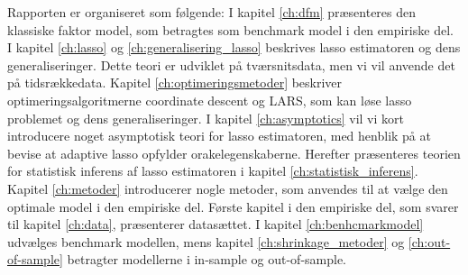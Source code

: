 Rapporten er organiseret som følgende: 
I kapitel \ref{ch:dfm} præsenteres den klassiske faktor model, som betragtes som benchmark model i den empiriske del.
I kapitel \ref{ch:lasso} og \ref{ch:generalisering_lasso} beskrives lasso estimatoren og dens generaliseringer. Dette teori er udviklet på tværsnitsdata, men vi vil anvende det på tidsrækkedata.
Kapitel \ref{ch:optimeringsmetoder} beskriver optimeringsalgoritmerne coordinate descent og LARS, som kan løse lasso problemet og dens generaliseringer.
I kapitel \ref{ch:asymptotics} vil vi kort introducere noget asymptotisk teori for lasso estimatoren, med henblik på at bevise at adaptive lasso opfylder orakelegenskaberne.
Herefter præsenteres teorien for statistisk inferens af lasso estimatoren i kapitel \ref{ch:statistisk_inferens}.
Kapitel \ref{ch:metoder} introducerer nogle metoder, som anvendes til at vælge den optimale model i den empiriske del.
Første kapitel i den empiriske del, som svarer til kapitel \ref{ch:data}, præsenterer datasættet.
I kapitel \ref{ch:benhcmarkmodel} udvælges benchmark modellen, mens kapitel \ref{ch:shrinkage_metoder} og \ref{ch:out-of-sample} betragter modellerne i in-sample og out-of-sample.

